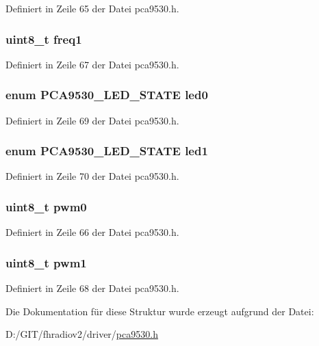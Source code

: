 Definiert in Zeile 65 der Datei pca9530.\+h.

\hypertarget{structpca9530_a05652b55717263bec9a0d63ff6690969}{}
\subsubsection[{freq1}]{\setlength{\rightskip}{0pt plus 5cm}uint8\+\_\+t freq1}\label{structpca9530_a05652b55717263bec9a0d63ff6690969}


Definiert in Zeile 67 der Datei pca9530.\+h.

\hypertarget{structpca9530_a3a42a3267d245b293db10c2cbb3330f9}{}
\subsubsection[{led0}]{\setlength{\rightskip}{0pt plus 5cm}enum {\bf P\+C\+A9530\+\_\+\+L\+E\+D\+\_\+\+S\+T\+A\+T\+E} led0}\label{structpca9530_a3a42a3267d245b293db10c2cbb3330f9}


Definiert in Zeile 69 der Datei pca9530.\+h.

\hypertarget{structpca9530_a3ac265af8bbeb022cd8ad2f21247f6ac}{}
\subsubsection[{led1}]{\setlength{\rightskip}{0pt plus 5cm}enum {\bf P\+C\+A9530\+\_\+\+L\+E\+D\+\_\+\+S\+T\+A\+T\+E} led1}\label{structpca9530_a3ac265af8bbeb022cd8ad2f21247f6ac}


Definiert in Zeile 70 der Datei pca9530.\+h.

\hypertarget{structpca9530_a2fb4d580ed22ad326b72701b98038bdc}{}
\subsubsection[{pwm0}]{\setlength{\rightskip}{0pt plus 5cm}uint8\+\_\+t pwm0}\label{structpca9530_a2fb4d580ed22ad326b72701b98038bdc}


Definiert in Zeile 66 der Datei pca9530.\+h.

\hypertarget{structpca9530_af1f85784c51fc6b57b6e713d160e6136}{}
\subsubsection[{pwm1}]{\setlength{\rightskip}{0pt plus 5cm}uint8\+\_\+t pwm1}\label{structpca9530_af1f85784c51fc6b57b6e713d160e6136}


Definiert in Zeile 68 der Datei pca9530.\+h.



Die Dokumentation für diese Struktur wurde erzeugt aufgrund der Datei\+:\begin{DoxyCompactItemize}
\item 
D\+:/\+G\+I\+T/fhradiov2/driver/\hyperlink{pca9530_8h}{pca9530.\+h}\end{DoxyCompactItemize}
